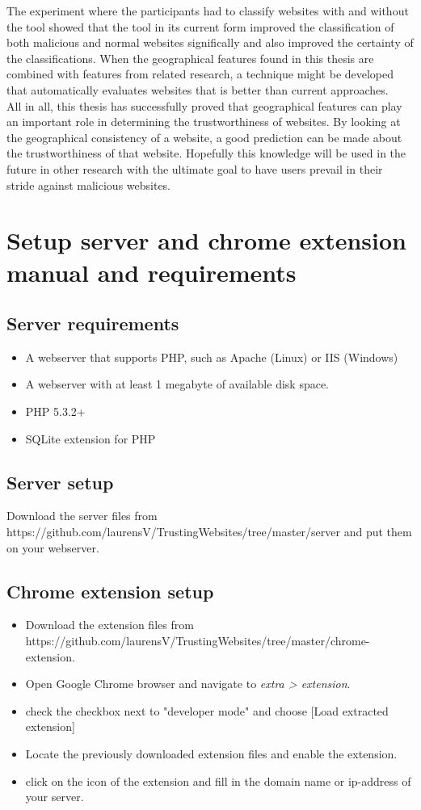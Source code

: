 \documentclass[twoside,openright,notitlepage]{uva-bachelor-thesis}
\begin{document}
The experiment where the participants had to classify websites with and without the tool showed that the tool in its current form improved the classification of both malicious and normal websites significally and also improved the certainty of the classifications. When the geographical features found in this thesis are combined with features from related research, a technique might be developed that automatically evaluates websites that is better than current approaches.\\

All in all, this thesis has successfully proved that geographical features can play an important role in determining the trustworthiness of websites. By looking at the geographical consistency of a website, a good prediction can be made about the trustworthiness of that website. Hopefully this knowledge will be used in the future in other research with the ultimate goal to have users prevail in their stride against malicious websites.

\printbibliography

\appendix
\chapter{Setup server and chrome extension manual and requirements}
\section{Server requirements}
\begin{itemize}
\item A webserver that supports PHP, such as Apache (Linux) or IIS (Windows)
\item A webserver with at least 1 megabyte of available disk space.
\item PHP 5.3.2+
\item SQLite extension for PHP
\end{itemize}
\section{Server setup}
Download the server files from https://github.com/laurensV/TrustingWebsites/tree/master/server and put them on your webserver.

\section{Chrome extension setup}
\begin{itemize}
\item Download the extension files from https://github.com/laurensV/TrustingWebsites/tree/master/chrome-extension.
\item Open Google Chrome browser and navigate to \emph{extra > extension}.
\item check the checkbox next to "developer mode" and choose [Load extracted extension]
\item Locate the previously downloaded extension files and enable the extension.
\item click on the icon of the extension and fill in the domain name or ip-address of your server.
\end{itemize}
\end{document}

